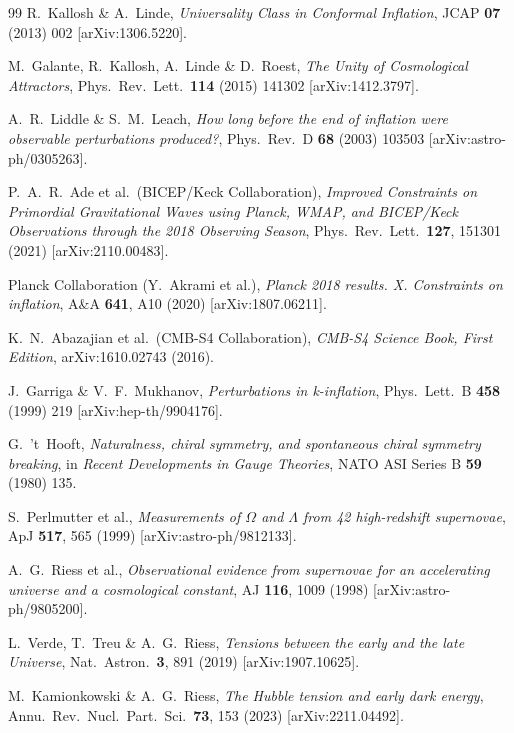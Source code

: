 \documentclass[12pt,a4paper]{article}
\renewcommand{\Omega}{\varOmega}
\begin{document}
\begin{thebibliography}{99}
R.~Kallosh \& A.~Linde,
\emph{Universality Class in Conformal Inflation},
JCAP \textbf{07} (2013) 002 [arXiv:1306.5220].

M.~Galante, R.~Kallosh, A.~Linde \& D.~Roest,
\emph{The Unity of Cosmological Attractors},
Phys.\ Rev.\ Lett.\ \textbf{114} (2015) 141302 [arXiv:1412.3797].

A.~R.~Liddle \& S.~M.~Leach,
\emph{How long before the end of inflation were observable perturbations produced?},
Phys.\ Rev.\ D \textbf{68} (2003) 103503 [arXiv:astro-ph/0305263].

P.~A.~R.~Ade et al.\ (BICEP/Keck Collaboration),
\emph{Improved Constraints on Primordial Gravitational Waves using Planck,
WMAP, and BICEP/Keck Observations through the 2018 Observing Season},
Phys.\ Rev.\ Lett.\ \textbf{127}, 151301 (2021) [arXiv:2110.00483].

Planck Collaboration (Y.~Akrami et al.),
\emph{Planck 2018 results. X. Constraints on inflation},
A\&A \textbf{641}, A10 (2020) [arXiv:1807.06211].

K.~N.~Abazajian et al.\ (CMB-S4 Collaboration),
\emph{CMB-S4 Science Book, First Edition},
arXiv:1610.02743 (2016).

J.~Garriga \& V.~F.~Mukhanov,
\emph{Perturbations in k-inflation},
Phys.\ Lett.\ B \textbf{458} (1999) 219 [arXiv:hep-th/9904176].

G.~'t~Hooft,
\emph{Naturalness, chiral symmetry, and spontaneous chiral symmetry breaking},
in \emph{Recent Developments in Gauge Theories}, NATO ASI Series B \textbf{59} (1980) 135.

S.~Perlmutter et al.,
\emph{Measurements of $\Omega$ and $\Lambda$ from 42 high-redshift supernovae},
ApJ \textbf{517}, 565 (1999) [arXiv:astro-ph/9812133].

A.~G.~Riess et al.,
\emph{Observational evidence from supernovae for an accelerating universe and a
cosmological constant},
AJ \textbf{116}, 1009 (1998) [arXiv:astro-ph/9805200].

L.~Verde, T.~Treu \& A.~G.~Riess,
\emph{Tensions between the early and the late Universe},
Nat.\ Astron.\ \textbf{3}, 891 (2019) [arXiv:1907.10625].

M.~Kamionkowski \& A.~G.~Riess,
\emph{The Hubble tension and early dark energy},
Annu.\ Rev.\ Nucl.\ Part.\ Sci.\ \textbf{73}, 153 (2023) [arXiv:2211.04492].


\end{thebibliography}
\end{document}

